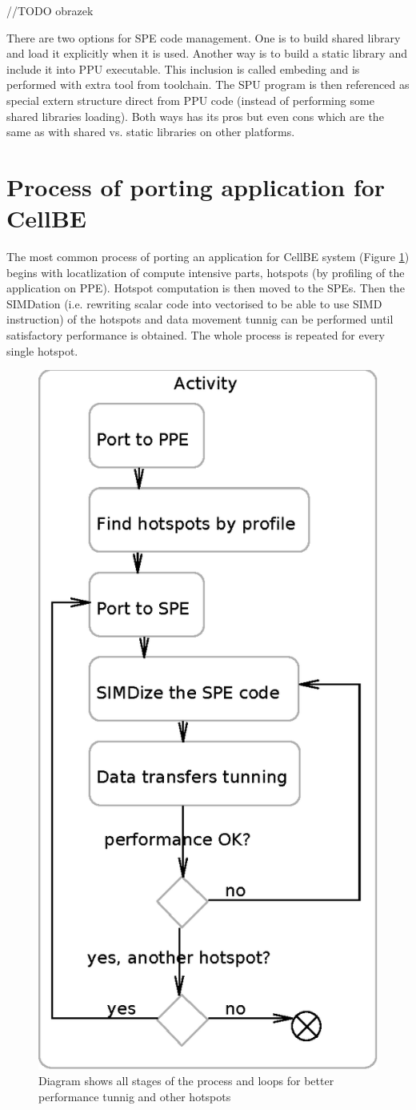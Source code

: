 //TODO obrazek

\par
There are two options for SPE code management.
 One is to build shared library and load it explicitly when it is used.
 Another way is to build a static library and include it into PPU executable.
 This inclusion is called embeding and is performed with extra tool from toolchain.
The SPU program is then referenced as special extern structure direct from PPU code (instead of performing some shared libraries loading).
 Both ways has its pros but even cons which are the same as with shared vs. static libraries on other platforms.


\section {Process of porting application for CellBE}

\par
The most common process of porting an application for CellBE system (Figure \ref{fg:appPorting}) begins with locatlization of compute intensive parts, hotspots (by profiling of the application on PPE).
 Hotspot computation is then moved to the SPEs.
 Then the SIMDation (i.e. rewriting scalar code into vectorised to be able to use SIMD instruction) of the hotspots and data movement tunnig can be performed until satisfactory performance is obtained.
 The whole process is repeated for every single hotspot.

\begin{figure}
    \centering
    \includegraphics[height=\textwidth]{data/portingCycle}
    \caption[Application for CellBE porting process]{Diagram shows all stages of the process and loops for better performance tunnig and other hotspots}
    \label{fg:appPorting}
\end{figure}
